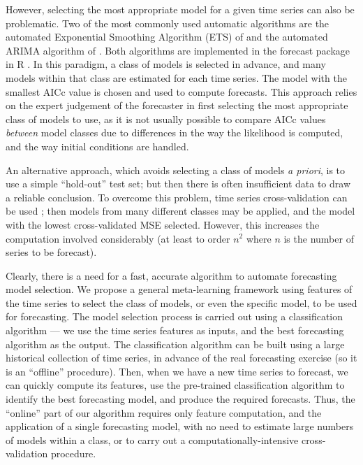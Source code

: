 \documentclass[11pt,a4paper,]{article}
\theoremstyle{definition}
\theoremstyle{definition}
\theoremstyle{definition}
\theoremstyle{remark}
\begin{document}
However, selecting the most appropriate model for a given time series
can also be problematic. Two of the most commonly used automatic
algorithms are the automated Exponential Smoothing Algorithm (ETS) of
\textcite{Hyndman2002} and the automated ARIMA algorithm of
\textcite{Hyndman2008}. Both algorithms are implemented in the forecast
package in R \autocite{forecast}. In this paradigm, a class of models is
selected in advance, and many models within that class are estimated for
each time series. The model with the smallest AICc value is chosen and
used to compute forecasts. This approach relies on the expert judgement
of the forecaster in first selecting the most appropriate class of
models to use, as it is not usually possible to compare AICc values
\emph{between} model classes due to differences in the way the
likelihood is computed, and the way initial conditions are handled.

An alternative approach, which avoids selecting a class of models
\emph{a priori}, is to use a simple ``hold-out'' test set; but then
there is often insufficient data to draw a reliable conclusion. To
overcome this problem, time series cross-validation can be used
\autocite{hyndman2014forecasting}; then models from many different
classes may be applied, and the model with the lowest cross-validated
MSE selected. However, this increases the computation involved
considerably (at least to order \(n^2\) where \(n\) is the number of
series to be forecast).

Clearly, there is a need for a fast, accurate algorithm to automate
forecasting model selection. We propose a general meta-learning
framework using features of the time series to select the class of
models, or even the specific model, to be used for forecasting. The
model selection process is carried out using a classification algorithm
--- we use the time series features as inputs, and the best forecasting
algorithm as the output. The classification algorithm can be built using
a large historical collection of time series, in advance of the real
forecasting exercise (so it is an ``offline'' procedure). Then, when we
have a new time series to forecast, we can quickly compute its features,
use the pre-trained classification algorithm to identify the best
forecasting model, and produce the required forecasts. Thus, the
``online'' part of our algorithm requires only feature computation, and
the application of a single forecasting model, with no need to estimate
large numbers of models within a class, or to carry out a
computationally-intensive cross-validation procedure.
\end{document}
